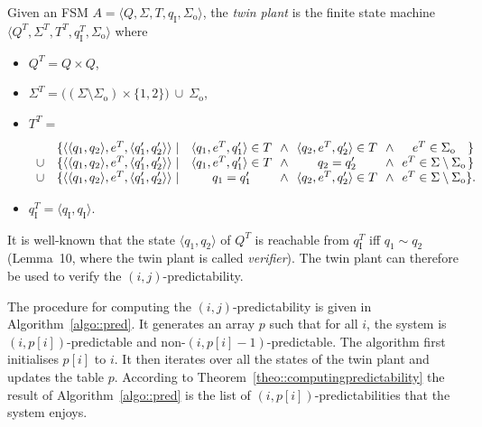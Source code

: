 \documentclass{article}
\newcommand{\qi}[0]{q_{\mathrm{I}}}
\newcommand{\sigmao}[0]{\Sigma_{\mathrm{o}}}
\newcommand{\Sigmao}[0]{\sigmao}
\newcommand{\set}[1]{\{#1\}}
\begin{document}
  Given an FSM $A = \langle Q,\Sigma,T,\qi,\sigmao\rangle$, 
  the \emph{twin plant} is the finite state machine 
  $\langle Q^T,\Sigma^T,T^T,\qi^T,\sigmao\rangle$ 
  where 
  \begin{itemize}
  \item 
    $Q^T = Q \times Q$, 
  \item 
    $\Sigma^T = \big((\Sigma \setminus \sigmao) \times \{1,2\}\big)
    \ \cup\ \Sigmao$, 
  \item 
    $T^T = $

    $
    \begin{array}{c c c @{\ \ \land\ \ } c @{\ \ \land\ \ }c@{}c}
      &
      \set{ 
      \langle\langle q_1,q_2\rangle,e^T,\langle q'_1,q'_2\rangle\rangle\mid&
      \langle q_1, e^T, q'_1\rangle \in T
      &
      \langle q_2, e^T, q'_2\rangle \in T
      &
      e^T \in \sigmao
      &
      }
      \\
      \cup & 
      \set{ 
      \langle\langle q_1,q_2\rangle,e^T,\langle q'_1,q'_2\rangle\rangle\mid&
      \langle q_1, e^T, q'_1\rangle \in T
      &
      q_2 = q'_2 
      &
      e^T \in \Sigma \setminus \sigmao
      &
      }
      \\
      \cup &
      \set{ 
      \langle\langle q_1,q_2\rangle,e^T,\langle q'_1,q'_2\rangle\rangle\mid&
      q_1 = q'_1 
      &
      \langle q_2, e^T, q'_2\rangle \in T
      &
      e^T \in \Sigma \setminus \sigmao
      &
      }.  
    \end{array}$
  \item 
    $\qi^T = \langle \qi,\qi\rangle$.  
  \end{itemize}

It is well-known that the state $\langle q_1,q_2\rangle$ of $Q^T$ 
is reachable from $\qi^T$ iff $q_1 \sim q_2$ 
(Lemma~10, \cite{genc-lafortune::automatica::09} 
where the twin plant is called \emph{verifier}).  
The twin plant can therefore be used to verify the $(i,j)$-predictability.  

The procedure for computing the $(i,j)$-predictability 
is given in Algorithm~\ref{algo::pred}.  
It generates an array $p$ such that for all $i$, 
the system is $(i,p[i])$-predictable and non-$(i,p[i]-1)$-predictable.  
The algorithm first initialises $p[i]$ to $i$.  
It then iterates over all the states of the twin plant 
and updates the table $p$.  
According to Theorem~\ref{theo::computingpredictability} 
the result of Algorithm~\ref{algo::pred} 
is the list of $(i,p[i])$-predictabilities that the system enjoys.  
\end{document}
